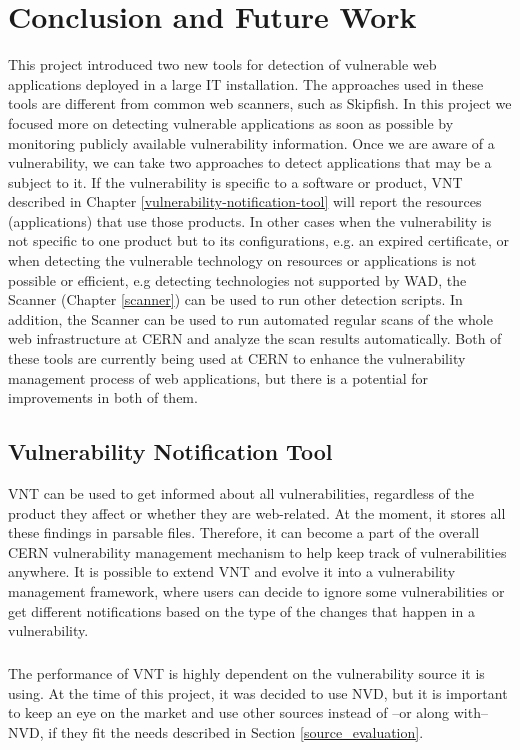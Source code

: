 \chapter{Conclusion and Future Work}
\label{conclusion-and-future-work}
This project introduced two new tools for detection of vulnerable web applications deployed in a large IT installation. The approaches used in these tools are different from common web scanners, such as Skipfish. In this project we focused more on detecting vulnerable applications as soon as possible by monitoring publicly available vulnerability information. Once we are aware of a vulnerability, we can take two approaches to detect applications that may be a subject to it. If the vulnerability is specific to a software or product, VNT described in Chapter \ref{vulnerability-notification-tool} will report the resources (applications) that use those products. In other cases when the vulnerability is not specific to one product but to its configurations, e.g. an expired certificate, or when detecting the vulnerable technology on resources or applications is not possible or efficient, e.g detecting technologies not supported by WAD, the Scanner (Chapter \ref{scanner}) can be used to run other detection scripts. In addition, the Scanner can be used to run automated regular scans of the whole web infrastructure at CERN and analyze the scan results automatically. Both of these tools are currently being used at CERN to enhance the vulnerability management process of web applications, but there is a potential for improvements in both of them. 
 
\section{Vulnerability Notification Tool}
VNT can be used to get informed about all vulnerabilities, regardless of the product they affect or whether they are web-related. At the moment, it stores all these findings in parsable files. Therefore, it can become a part of the overall CERN vulnerability management mechanism to help keep track of vulnerabilities anywhere. It is possible to extend VNT and evolve it into a vulnerability management framework, where users can decide to ignore some vulnerabilities or get different notifications based on the type of the changes that happen in a vulnerability.
\paragraph{}
The performance of VNT is highly dependent on the vulnerability source it is using. At the time of this project, it was decided to use NVD,  but it is important to keep an eye on the market and use other sources instead of --or along with-- NVD, if they fit the needs described in Section \ref{source_evaluation}. 

